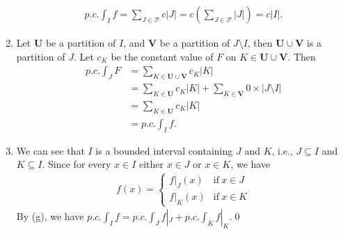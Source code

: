 \documentclass{book}
\begin{document}
\begin{enumerate}
        \begin{align*}
            p.c.\int_{I}f
            =\sum_{J\in\mathcal{P}}c|J|
            =c\left(\sum_{J\in\mathcal{P}}|J|\right)
            =c|I|.
        \end{align*}
    \item Let $\mathbf{U}$ be a partition of $I$, and $\mathbf{V}$ be a partition of $J\setminus I$, then $\mathbf{U}\cup\mathbf{V}$ is a partition of $J$. Let $c_K$ be the constant value of $F$ on $K\in\mathbf{U}\cup\mathbf{V}$. Then
        \begin{align*}
            p.c.\int_{J}F
            &=\sum_{K\in\mathbf{U}\cup\mathbf{V}}c_K|K|\\
            &=\sum_{K\in\mathbf{U}}c_K|K|+\sum_{K\in\mathbf{V}}0\times|J\setminus I|\\
            &=\sum_{K\in\mathbf{U}}c_K|K|\\
            &=p.c.\int_{I}f.
        \end{align*}
    \begin{comment}
    \item Let $\mathcal{U}=\mathcal{P}\cup\{J\setminus I\}$ be a partition of $J$. Let $K\in\mathcal{U}$, then we either have $K\in\mathcal{P}$ or $K\in\{J\setminus I\}$. Let $c_K$ be the constant value of $F$ on $K\in\mathcal{U}$. Then
        \begin{align*}
            p.c.\int_{J}F
            &=\sum_{K\in\mathcal{U}}c_K|K|\\
            &=\sum_{K\in\mathcal{P}}c_K|K|+\sum_{K\in\{J\setminus I\}}0\times|J\setminus I|\\
            &=\sum_{K\in\mathcal{P}}c_K|K|\\
            &=p.c.\int_{I}f.
        \end{align*}
    \end{comment}
    \item We can see that $I$ is a bounded interval containing $J$ and $K$, i.e., $J\subseteq I$ and $K\subseteq I$. Since for every $x\in I$ either $x\in J$ or $x\in K$, we have
        \begin{align*}
            f(x)=\left\{\begin{array}{cc}
                f|_J(x)&\text{if}\ x\in J\\
                f|_K(x)&\text{if}\ x\in K
            \end{array}\right.
        \end{align*}
    By (g), we have $p.c.\int_{I}f=p.c.\int_{J}f|_J+p.c.\int_{K}f|_K$.\qed
\end{enumerate}
\end{document}
